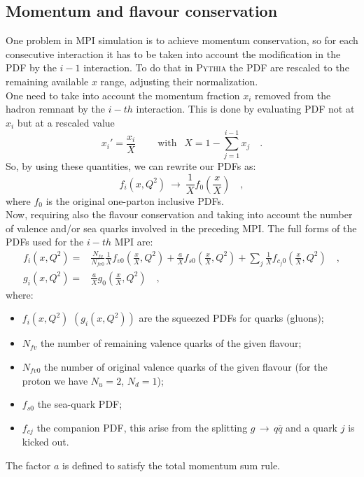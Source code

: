 \subsection{Momentum and flavour conservation}

One problem in MPI simulation is to achieve momentum conservation, so for each consecutive interaction it has to be taken into account the modification in the PDF by the $i-1$ interaction. To do that in \textsc{Pythia} the PDF are rescaled to the remaining available $x$ range, adjusting their normalization.
\\
One need to take into account the momentum fraction $x_i$ removed from the hadron remnant by the $i-th$ interaction. This is done by evaluating PDF not at $x_i$ but at a rescaled value
\begin{equation}
	x_i'=\frac{x_i}{X} \qquad \ \text{with }\ \ X=1-\sum_{j=1}^{i-1}x_j\quad .
\end{equation}
So, by using these quantities, we can rewrite our PDFs as:
\begin{equation}
	f_i(x,Q^2)\ \longrightarrow\ \frac{1}{X}f_0\left(\frac{x}{X}\right)\quad ,
\end{equation}
where $f_0$ is the original one-parton inclusive PDFs.
\\
Now, requiring also the flavour conservation and taking into account the number of valence and/or sea quarks involved in the preceding MPI. The full forms of the PDFs used for the $i-th$ MPI are:
\begin{align}
f_i(x,Q^2) =&  \frac{N_{fv}}{N_{fv0}}\frac{1}{X} f_{v0}\left( \frac{x}{X},Q^2 \right) + \frac{a}{X}f_{s0}\left( \frac{x}{X},Q^2 \right)+\displaystyle\sum_j \frac{1}{X} f_{c_j0}\left( \frac{x}{X},Q^2 \right) \quad,\\
g_i(x,Q^2) =& \frac{a}{X}g_0\left( \frac{x}{X},Q^2 \right)\quad, 
\end{align}
where: 
\begin{itemize}
	\item $f_i(x,Q^2)$ $(g_i(x,Q^2))$ are the squeezed PDFs for quarks (gluons);
	\item $N_{fv}$ the number of remaining valence quarks of the given flavour;
	\item $N_{fv0}$ the number of original valence quarks of the given flavour (for the proton we have $N_u=2$, $N_d=1$);
	\item $f_{s0}$ the sea-quark PDF;
	\item $f_{cj}$ the companion PDF, this arise from the splitting $g\,\rightarrow\,q\overline{q}$ and a quark $j$ is kicked out.
\end{itemize}
The factor $a$ is defined to satisfy the total momentum sum rule.

